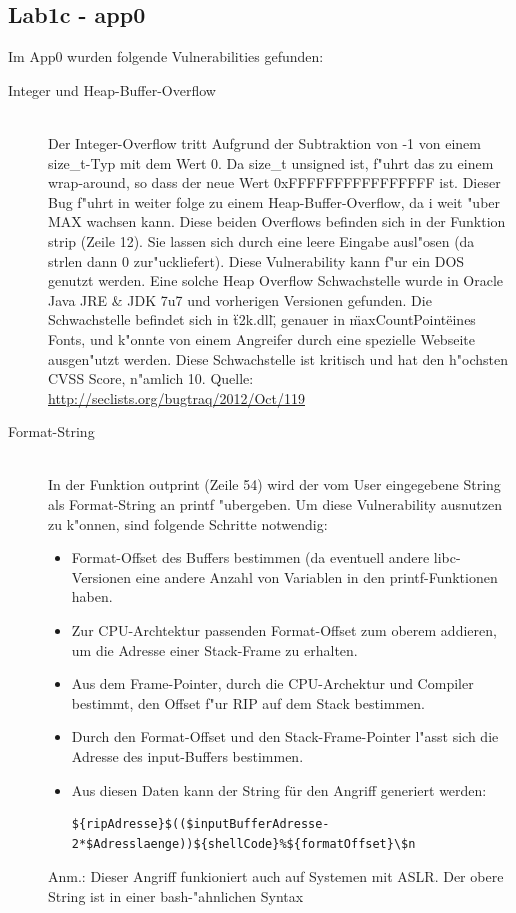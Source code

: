 \documentclass[12pt,a4paper,titlepage,oneside]{scrartcl}
\begin{document}
\subsection{Lab1c - app0}
Im App0 wurden folgende Vulnerabilities gefunden:
\begin{description}
  \item[Integer und Heap-Buffer-Overflow] \hfill \\
    Der Integer-Overflow tritt Aufgrund der Subtraktion von -1 von einem size\_t-Typ mit dem Wert 0. Da size\_t unsigned ist, f"uhrt das zu einem wrap-around, so dass der neue Wert 0xFFFFFFFFFFFFFFFF ist. \newline
    Dieser Bug f"uhrt in weiter folge zu einem Heap-Buffer-Overflow, da i weit "uber MAX wachsen kann.\newline
    Diese beiden Overflows befinden sich in der Funktion strip (Zeile 12). Sie lassen sich durch eine leere Eingabe ausl"osen (da strlen dann 0 zur"uckliefert).
    Diese Vulnerability kann f"ur ein DOS genutzt werden.\newline
    Eine solche Heap Overflow Schwachstelle wurde in Oracle Java JRE \& JDK 7u7 und vorherigen Versionen gefunden. Die Schwachstelle befindet sich in \"t2k.dll\", genauer in \"maxCountPoint\" eines Fonts, und k"onnte von einem Angreifer durch eine spezielle Webseite ausgen"utzt werden. Diese Schwachstelle ist kritisch und hat den h"ochsten CVSS Score, n"amlich 10.\newline
    Quelle: \url{http://seclists.org/bugtraq/2012/Oct/119}
    
  \item[Format-String] \hfill \\
  In der Funktion outprint (Zeile 54) wird der vom User eingegebene String als Format-String an printf "ubergeben.
    Um diese Vulnerability ausnutzen zu k"onnen, sind folgende Schritte notwendig:
    \begin{itemize}
        \item Format-Offset des Buffers bestimmen (da eventuell andere libc-Versionen eine andere Anzahl von Variablen in den printf-Funktionen haben.
        \item Zur CPU-Archtektur passenden Format-Offset zum oberem addieren, um die Adresse einer Stack-Frame zu erhalten.
        \item Aus dem Frame-Pointer, durch die CPU-Archektur und Compiler bestimmt, den Offset f"ur RIP auf dem Stack bestimmen.
        \item Durch den Format-Offset und den Stack-Frame-Pointer l"asst sich die Adresse des input-Buffers bestimmen.
        \item Aus diesen Daten kann der String für den Angriff generiert werden:\\
        \begin{lstlisting}
${ripAdresse}$(($inputBufferAdresse-2*$Adresslaenge))${shellCode}%${formatOffset}\$n
        \end{lstlisting}
    \end{itemize}
    Anm.: Dieser Angriff funkioniert auch auf Systemen mit ASLR. Der obere String ist in einer bash-"ahnlichen Syntax
    

\end{description}
\end{document}
